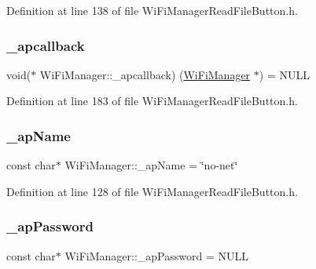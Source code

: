 Definition at line 138 of file Wi\+Fi\+Manager\+Read\+File\+Button.\+h.

\mbox{\label{class_wi_fi_manager_ad166247d94aef10a3a8aa34da1351b27}} 
\subsubsection{\texorpdfstring{\+\_\+apcallback}{\_apcallback}}
{\footnotesize\ttfamily void($\ast$ Wi\+Fi\+Manager\+::\+\_\+apcallback) (\hyperlink{class_wi_fi_manager}{Wi\+Fi\+Manager} $\ast$) = N\+U\+LL\hspace{0.3cm}{\ttfamily [private]}}



Definition at line 183 of file Wi\+Fi\+Manager\+Read\+File\+Button.\+h.

\mbox{\label{class_wi_fi_manager_a2c27e2f375122254cde4b2fd9ed1e117}} 
\subsubsection{\texorpdfstring{\+\_\+ap\+Name}{\_apName}}
{\footnotesize\ttfamily const char$\ast$ Wi\+Fi\+Manager\+::\+\_\+ap\+Name = \char`\"{}no-\/net\char`\"{}\hspace{0.3cm}{\ttfamily [private]}}



Definition at line 128 of file Wi\+Fi\+Manager\+Read\+File\+Button.\+h.

\mbox{\label{class_wi_fi_manager_a63fb98629ab722ec513c14c73f352c12}} 
\subsubsection{\texorpdfstring{\+\_\+ap\+Password}{\_apPassword}}
{\footnotesize\ttfamily const char$\ast$ Wi\+Fi\+Manager\+::\+\_\+ap\+Password = N\+U\+LL\hspace{0.3cm}{\ttfamily [private]}}



